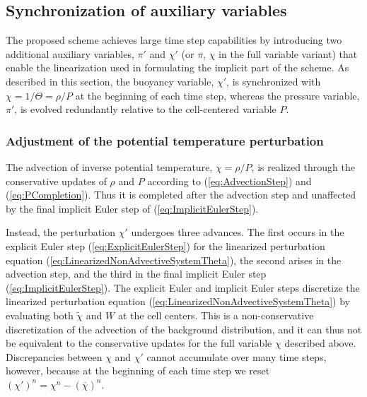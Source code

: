 \documentclass{ametsoc}
\newcommand{\sblue}[1]{\textcolor{sblue}{#1}}
\newcommand{\revision}[1]{\sblue{#1}}
\theoremstyle{definition}
\newcommand{\eq}[1]{(\ref{#1})}
\newcommand{\chibar}{\overline{\chi}}
\newcommand{\chitilde}{{\widetilde \chi}}
\begin{document}

\subsection{Synchronization of auxiliary variables}
\label{ssec:Synchronization}

\revision{The proposed scheme achieves large time step capabilities by introducing
two additional auxiliary variables, $\pi'$ and $\chi'$ (or $\pi$, $\chi$ in the
full variable variant) that enable the
linearization used in formulating the implicit part of the scheme. As described
in this section, the buoyancy variable, $\chi'$, is synchronized with 
$\chi = 1/\Theta = \rho/P$ at the beginning of each time step, whereas the 
pressure variable, $\pi'$, is evolved redundantly relative to the cell-centered 
variable $P$.}


\subsubsection{Adjustment of the potential temperature perturbation}
\label{ssec:PotTempAdj}

\revision{The advection of inverse potential temperature, $\chi = \rho/P$, is realized through the conservative updates of $\rho$ and $P$ according to 
\eq{eq:AdvectionStep} and \eq{eq:PCompletion}. Thus it is completed after
the advection step and unaffected by the final implicit
Euler step of \eq{eq:ImplicitEulerStep}.}

\revision{Instead, the perturbation $\chi'$ undergoes three advances. The first occurs in the explicit Euler step \eq{eq:ExplicitEulerStep} for the linearized perturbation equation \eq{eq:LinearizedNonAdvectiveSystemTheta}, the second arises in the advection step, and the third in the final implicit Euler step \eq{eq:ImplicitEulerStep}. The explicit Euler and implicit Euler steps discretize the linearized perturbation equation \eq{eq:LinearizedNonAdvectiveSystemTheta} by evaluating both $\chitilde$ and $W$ at the cell centers. This is a non-conservative discretization of the advection of the background distribution, and it can thus not be equivalent to the conservative updates for the full variable $\chi$ described above. Discrepancies between $\chi$ and $\chi'$ cannot accumulate over many time steps, however, because at the beginning of each time step we reset  $(\chi')^n = \chi^n - (\chibar)^n$.}
\end{document}
